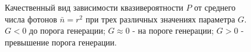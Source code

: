 \begin{figure}
\centering



\caption{Качественный вид зависимости квазивероятности $P$ от среднего
  числа фотонов $\bar{n} = r^2$ при трех различных значениях параметра
  $G$. $G < 0$ до порога генерации; $G \approx 0$ - на пороге
  генерации; $G > 0$ - превышение порога генерации.}
\label{figPart2Ch1_6}
\end{figure}
